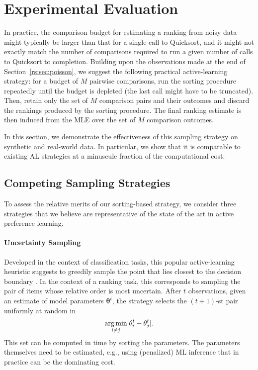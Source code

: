 \section{Experimental Evaluation}  %
\label{rs:sec:experiments}

In practice, the comparison budget for estimating a ranking from noisy data might typically be larger than that for a single call to Quicksort, and it might not exactly match the number of comparisons required to run a given number of calls to Quicksort to completion.
Building upon the observations made at the end of Section~\ref{rs:sec:poisson}, we suggest the following practical active-learning strategy:
for a budget of $M$ pairwise comparisons, run the sorting procedure repeatedly until the budget is depleted (the last call might have to be truncated).
Then, retain only the set of $M$ comparison pairs and their outcomes and discard the rankings produced by the sorting procedure.
The final ranking estimate is then induced from the MLE over the set of $M$ comparison outcomes.

In this section, we demonstrate the effectiveness of this sampling strategy on synthetic and real-world data.
In particular, we show that it is comparable to existing AL strategies at a minuscule fraction of the computational cost.


\subsection{Competing Sampling Strategies}

To assess the relative merits of our sorting-based strategy, we consider three strategies that we believe are representative of the state of the art in active preference learning.

\paragraph{Uncertainty Sampling}
Developed in the context of classification tasks, this popular active-learning heuristic suggests to greedily sample the point that lies closest to the decision boundary \citep{settles2012active}.
In the context of a ranking task, this corresponds to sampling the pair of items whose relative order is most uncertain.
After $t$ observations, given an estimate of model parameters $\bm{\theta}^t$, the strategy selects the $(t\!+\!1)$-st pair uniformly at random in
\begin{align*}
\operatorname*{arg\,min}_{i \ne j} \lvert\theta^t_i - \theta^t_j\rvert.
\end{align*}
This set can be computed in time  by sorting the parameters.
The parameters themselves need to be estimated, e.g., using (penalized) ML inference that in practice can be the dominating cost.

